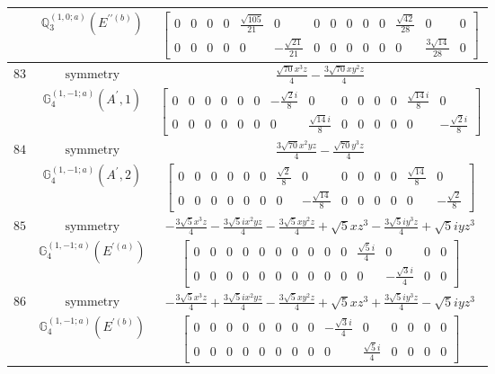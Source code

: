 \documentclass[fleqn,8pt,landscape]{jsarticle}
\begin{document}
\begin{longtable}{ccc}
$  $ & $ \mathbb{Q}_{3}^{(1,0;a)}(E^{\prime\prime(b)}) $ & $ \begin{bmatrix} 0 & 0 & 0 & 0 & \frac{\sqrt{105}}{21} & 0 & 0 & 0 & 0 & 0 & 0 & \frac{\sqrt{42}}{28} & 0 & 0 \\ 0 & 0 & 0 & 0 & 0 & - \frac{\sqrt{21}}{21} & 0 & 0 & 0 & 0 & 0 & 0 & \frac{3 \sqrt{14}}{28} & 0 \end{bmatrix} $ \\ \hline
$ 83 $ & $ \text{symmetry} $ & $ \frac{\sqrt{70} x^{3} z}{4} - \frac{3 \sqrt{70} x y^{2} z}{4} $ \\
$  $ & $ \mathbb{G}_{4}^{(1,-1;a)}(A^{\prime},1) $ & $ \begin{bmatrix} 0 & 0 & 0 & 0 & 0 & 0 & - \frac{\sqrt{2} i}{8} & 0 & 0 & 0 & 0 & 0 & \frac{\sqrt{14} i}{8} & 0 \\ 0 & 0 & 0 & 0 & 0 & 0 & 0 & \frac{\sqrt{14} i}{8} & 0 & 0 & 0 & 0 & 0 & - \frac{\sqrt{2} i}{8} \end{bmatrix} $ \\ \hline
$ 84 $ & $ \text{symmetry} $ & $ \frac{3 \sqrt{70} x^{2} y z}{4} - \frac{\sqrt{70} y^{3} z}{4} $ \\
$  $ & $ \mathbb{G}_{4}^{(1,-1;a)}(A^{\prime},2) $ & $ \begin{bmatrix} 0 & 0 & 0 & 0 & 0 & 0 & \frac{\sqrt{2}}{8} & 0 & 0 & 0 & 0 & 0 & \frac{\sqrt{14}}{8} & 0 \\ 0 & 0 & 0 & 0 & 0 & 0 & 0 & - \frac{\sqrt{14}}{8} & 0 & 0 & 0 & 0 & 0 & - \frac{\sqrt{2}}{8} \end{bmatrix} $ \\ \hline
$ 85 $ & $ \text{symmetry} $ & $ - \frac{3 \sqrt{5} x^{3} z}{4} - \frac{3 \sqrt{5} i x^{2} y z}{4} - \frac{3 \sqrt{5} x y^{2} z}{4} + \sqrt{5} x z^{3} - \frac{3 \sqrt{5} i y^{3} z}{4} + \sqrt{5} i y z^{3} $ \\
$  $ & $ \mathbb{G}_{4}^{(1,-1;a)}(E^{\prime(a)}) $ & $ \begin{bmatrix} 0 & 0 & 0 & 0 & 0 & 0 & 0 & 0 & 0 & 0 & \frac{\sqrt{5} i}{4} & 0 & 0 & 0 \\ 0 & 0 & 0 & 0 & 0 & 0 & 0 & 0 & 0 & 0 & 0 & - \frac{\sqrt{3} i}{4} & 0 & 0 \end{bmatrix} $ \\ \hline
$ 86 $ & $ \text{symmetry} $ & $ - \frac{3 \sqrt{5} x^{3} z}{4} + \frac{3 \sqrt{5} i x^{2} y z}{4} - \frac{3 \sqrt{5} x y^{2} z}{4} + \sqrt{5} x z^{3} + \frac{3 \sqrt{5} i y^{3} z}{4} - \sqrt{5} i y z^{3} $ \\
$  $ & $ \mathbb{G}_{4}^{(1,-1;a)}(E^{\prime(b)}) $ & $ \begin{bmatrix} 0 & 0 & 0 & 0 & 0 & 0 & 0 & 0 & - \frac{\sqrt{3} i}{4} & 0 & 0 & 0 & 0 & 0 \\ 0 & 0 & 0 & 0 & 0 & 0 & 0 & 0 & 0 & \frac{\sqrt{5} i}{4} & 0 & 0 & 0 & 0 \end{bmatrix} $ \\ \hline

\end{longtable}
\end{document}

